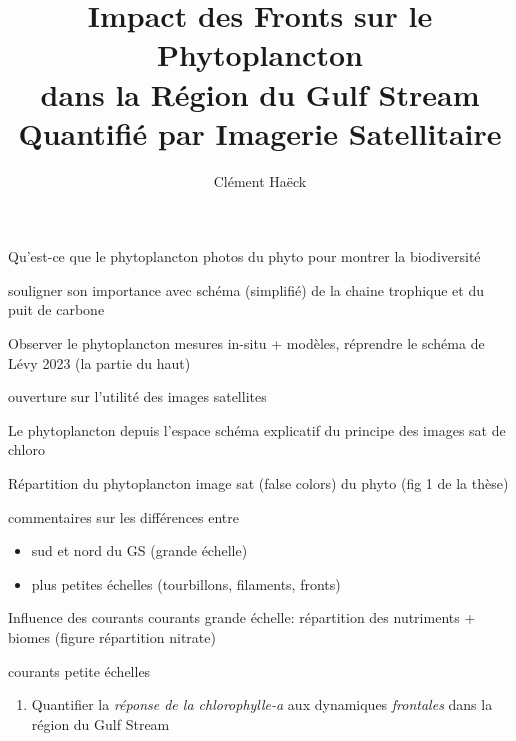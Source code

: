 \documentclass[11pt, french]{beamer}
\title{%
  Impact des Fronts sur le Phytoplancton\\
  dans la Région du Gulf Stream\\
  Quantifié par Imagerie Satellitaire
}
\author{Clément Haëck}
\institute{%
  Laboratoire d'Océanographie et du Climat\\Expérimentations et Analyses Numériques
}
\begin{document}
{
  \begin{frame}
    \titlepage%
  \end{frame}
}

\begin{frame}{Qu'est-ce que le phytoplancton}
  photos du phyto pour montrer la biodiversité

  souligner son importance avec schéma (simplifié) de la chaine trophique et du puit de carbone
\end{frame}

\begin{frame}{Observer le phytoplancton}
  mesures in-situ + modèles, réprendre le schéma de Lévy 2023 (la partie du haut)

  ouverture sur l'utilité des images satellites
\end{frame}

\begin{frame}{Le phytoplancton depuis l'espace}
  schéma explicatif du principe des images sat de chloro
\end{frame}

\begin{frame}{Répartition du phytoplancton}
  image sat (false colors) du phyto (fig 1 de la thèse)

  commentaires sur les différences entre
  \begin{itemize}
    \item sud et nord du GS (grande échelle)
    \item plus petites échelles (tourbillons, filaments, \alert{fronts})
  \end{itemize}
\end{frame}

\begin{frame}{Influence des courants}
  courants grande échelle: répartition des nutriments + biomes (figure répartition nitrate)

  courants petite échelles
\end{frame}

\begin{frame}
  \vspace{2em}

  \begin{enumerate}
    \setlength{\itemsep}{1em}
    \item Quantifier la \emph{réponse de la chlorophylle-a} aux dynamiques \emph{frontales} dans la région du Gulf Stream
  \end{enumerate}
\end{frame}
\end{document}
